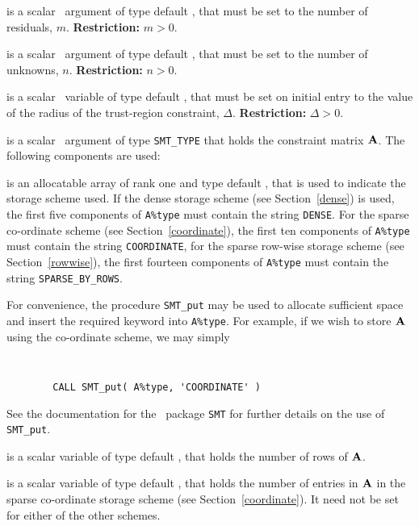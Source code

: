 \documentclass{galahad}
\begin{document}
\begin{description}

 is a scalar \intentin\ argument of type default \integer, that must be 
set to the number of residuals, $m$. {\bf Restriction: } $m  >  0$. 
 
 is a scalar \intentin\ argument of type default \integer, that must be 
set to the number of unknowns, $n$. {\bf Restriction: } $n  >  0$. 
 
 is a scalar \intentin\ variable of type default 
\realdp, 
that must be set on initial entry
to the value of the radius of the trust-region constraint, $\Delta$. 
{\bf Restriction: } $\Delta > 0$. 
 
 is a scalar \intentin\ argument of type {\tt SMT\_TYPE} 
that holds the constraint matrix ${\mathbf{A}}$. The following components are used:

\begin{description}

 is an allocatable array of rank one and type default 
\character, that
is used to indicate the storage scheme used. If the dense storage scheme 
(see Section~\ref{dense}) is used, 
the first five components of {\tt A\%type} must contain the
string {\tt DENSE}.
For the sparse co-ordinate scheme (see Section~\ref{coordinate}), 
the first ten components of {\tt A\%type} must contain the
string {\tt COORDINATE},  
for the sparse row-wise storage scheme (see Section~\ref{rowwise}),
the first fourteen components of {\tt A\%type} must contain the
string {\tt SPARSE\_BY\_ROWS}.

For convenience, the procedure {\tt SMT\_put} 
may be used to allocate sufficient space and insert the required keyword
into {\tt A\%type}.
For example, if we wish to store ${\mathbf{A}}$ using the co-ordinate scheme,
we may simply
{\tt 
\begin{verbatim}
        CALL SMT_put( A%type, 'COORDINATE' )
\end{verbatim}
}
\noindent
See the documentation for the \galahad\ package {\tt SMT} 
for further details on the use of {\tt SMT\_put}.

 is a scalar variable of type default \integer, that 
holds the number of rows of ${\mathbf{A}}$.

 is a scalar variable of type default \integer, that 
holds the number of entries in ${\mathbf{A}}$
in the sparse co-ordinate storage scheme (see Section~\ref{coordinate}). 
It need not be set for either of the other schemes.


\end{description}
\end{description}
\end{document}
